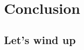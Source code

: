 
\chapter{Conclusion}
\label{chapter5}
\ifpdf
    \graphicspath{{Chapter5/Figs/Raster/}{Chapter5/Figs/PDF/}{Chapter5/Figs/}}
\else
    \graphicspath{{Chapter5/Figs/Vector/}{Chapter5/Figs/}}
\fi


\section[Short title]{Let's wind up}











